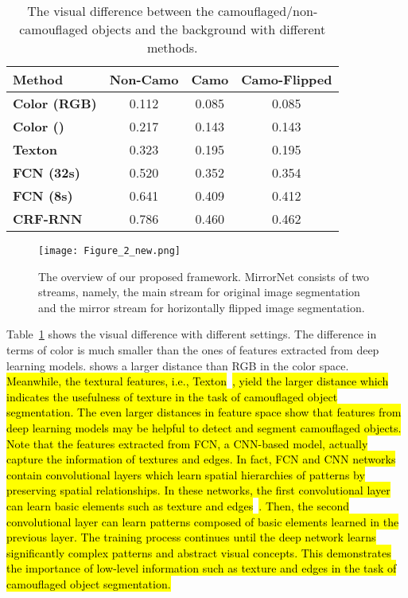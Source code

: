 \documentclass[journal]{IEEEtran}
\DeclareRobustCommand{\hlcyan}[1]{{\sethlcolor{white}\hl{#1}}}
\begin{document}
\begin{table}[!t]
	\small	
	\centering
	\begin{tabular}{|l|c|c|c|}
		\hline
		\textbf{Method} & \textbf{Non-Camo} & \textbf{Camo} & \textbf{Camo-Flipped }\\
		\hline
		\textbf{Color (RGB)} & 0.112 & 0.085 & 0.085  \\
		
		\hline
		\textbf{Color ()} & 0.217 & 0.143 & 0.143  \\
		
		\hline
		
		\textbf{Texton~\cite{texton} } & 0.323 & 0.195 & 0.195  \\
		
		\hline
		\textbf{FCN (32s)~\cite{Long-ICCV2015}} & 0.520 & 0.352 & 0.354  \\
		\hline
		\textbf{FCN (8s)~\cite{Long-ICCV2015}} & 0.641 & 0.409 & 0.412  \\
		\hline
		\textbf{CRF-RNN~\cite{CRF}} & 0.786 & 0.460 & 0.462  \\
		\hline
	\end{tabular}
	\caption{The visual difference between the camouflaged/non-camouflaged objects and the background with different methods. 
} 
	\label{table:motivation}
\end{table}

\begin{figure*}[t]
	\centering
	\texttt{[image: Figure\_2\_new.png]}
\caption{The overview of our proposed framework. MirrorNet consists of two streams, namely, the main stream for original image segmentation and the mirror stream for horizontally flipped image segmentation.}
	\label{fig:framework}
\end{figure*}


Table~\ref{table:motivation} shows the visual difference with different  settings. The difference in terms of color is much smaller than the ones of features extracted from deep learning models.  shows a larger distance than RGB in the color space. \hlcyan{Meanwhile, the textural features, i.e.,  Texton}~\cite{texton}\hlcyan{, yield the larger distance which indicates the usefulness of texture in the task of  camouflaged object segmentation. The even larger distances in feature space show that features from deep learning models may be helpful to detect and segment camouflaged objects. Note that the features extracted from FCN, a CNN-based model, actually capture the information of textures and edges. In fact, FCN and CNN networks contain convolutional layers which learn spatial hierarchies of patterns by preserving spatial relationships. In these networks, the first convolutional layer can learn basic elements such as texture and edges}~\cite{QuocLe}\hlcyan{. Then, the second convolutional layer can learn patterns composed of basic elements learned in the previous layer. The training process continues until the deep network learns  significantly complex patterns and abstract visual concepts. This demonstrates the importance of low-level information such as texture and edges in the task of camouflaged object segmentation.} 
\end{document}
